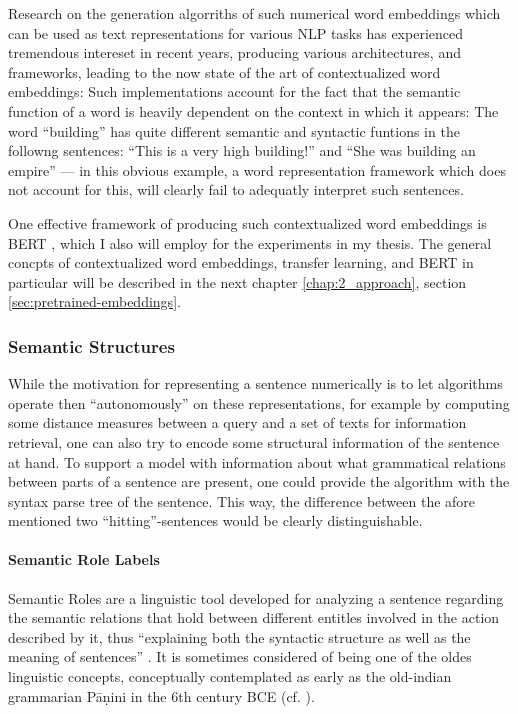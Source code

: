 Research on the generation algorriths of such numerical word embeddings which can
be used as text representations for various NLP tasks has experienced tremendous
intereset in recent years, producing various architectures, and frameworks, leading
to the now state of the art of contextualized word embeddings: Such implementations
account for the fact that the semantic function of a word is heavily dependent on
the context in which it appears: The word ``building'' has quite different semantic
and syntactic funtions in the followng sentences: ``This is a very high building!''
and ``She was building an empire'' --- in this obvious example, a word representation
framework which does not account for this, will clearly fail to adequatly interpret
such sentences.

One effective framework of producing such contextualized word embeddings is BERT \citep{devlin2018bert},
which I also will employ for the experiments in my thesis. The general concpts of contextualized
word embeddings, transfer learning, and BERT in particular will be described in the next chapter
\ref{chap:2_approach}, section \ref{sec:pretrained-embeddings}.


\subsubsection*{Semantic Structures}

While the motivation for representing a sentence numerically is to let algorithms operate
then ``autonomously'' on these representations, for example by computing some distance measures
between a query and a set of texts for information retrieval, one can also try to encode
some structural information of the sentence at hand.
To support a model with information about what grammatical relations between
parts of a sentence are present, one could provide the algorithm with the syntax parse
tree of the sentence. This way, the difference between the afore mentioned
two ``hitting''-sentences would be clearly distinguishable.

\paragraph*{Semantic Role Labels}

Semantic Roles are a linguistic tool developed for analyzing a sentence regarding
the semantic relations that hold between different entitles involved in the action
described by it, thus ``explaining both the syntactic structure as well as the meaning
of sentences'' \cite{bussmann2006routledge}. It is sometimes considered of being one
of the oldes linguistic concepts, conceptually contemplated as early as the old-indian
grammarian P\=a\d{n}ini in the 6th century BCE (cf. \citep{gildea2002automatic}).

